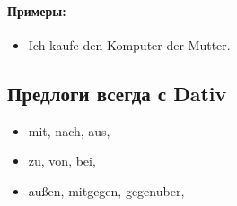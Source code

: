 \paragraph{Примеры:}

\begin{itemize}
\item Ich kaufe den Komputer der Mutter.
~\\ 
\end{itemize}

\subsection{Предлоги всегда с Dativ}

\begin{itemize}
\item mit, nach, aus,
\item zu, von, bei,
\item außen, mitgegen, gegenuber,
\end{itemize}


